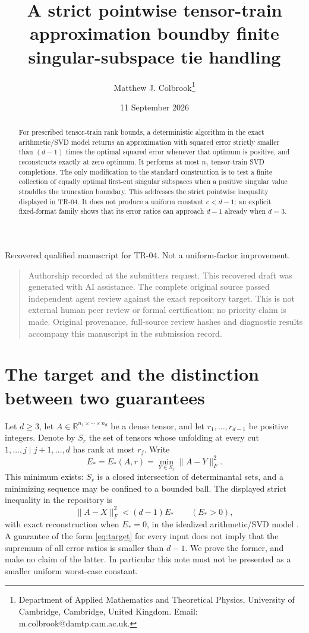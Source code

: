 \documentclass[11pt]{article}
\title{A strict pointwise tensor-train approximation bound\newline by finite singular-subspace tie handling}
\author{Matthew J. Colbrook\thanks{Department of Applied Mathematics and Theoretical Physics, University of Cambridge, Cambridge, United Kingdom. Email: m.colbrook@damtp.cam.ac.uk.}}
\date{11 September 2026}
\newcommand{\R}{\mathbb R}
\begin{document}
\maketitle
\begin{center}\small Recovered qualified manuscript for TR-04. Not a uniform-factor improvement.\end{center}
\begin{quote}\small Authorship recorded at the submitter\textquotesingle s request. This recovered draft was generated with AI assistance. The complete original source passed independent agent review against the exact repository target. This is not external human peer review or formal certification; no priority claim is made. Original provenance, full-source review hashes and diagnostic results accompany this manuscript in the submission record.\end{quote}
\begin{abstract}
For prescribed tensor-train rank bounds, a deterministic algorithm in
the exact arithmetic/SVD model returns an approximation with squared
error strictly smaller than $(d-1)$ times the optimal squared error
whenever that optimum is positive, and reconstructs exactly at zero
optimum. It performs at most $n_1$ tensor-train SVD completions. The only
modification to the standard construction is to test a finite collection
of equally optimal first-cut singular subspaces when a positive singular
value straddles the truncation boundary. This addresses the strict
pointwise inequality displayed in TR-04. It does not produce a uniform
constant $c<d-1$: an explicit fixed-format family shows that its error
ratios can approach $d-1$ already when $d=3$.
\end{abstract}

\section{The target and the distinction between two guarantees}
Let $d\ge3$, let $A\in\R^{n_1\times\cdots\times n_d}$ be a dense tensor,
and let $r_1,\ldots,r_{d-1}$ be positive integers. Denote by $S_r$ the
set of tensors whose unfolding at every cut $1,\ldots,j\mid j+1,\ldots,d$
has rank at most $r_j$. Write
\[
 E_* = E_*(A,r)=\min_{Y\in S_r}\|A-Y\|_F^2.
\]
This minimum exists: $S_r$ is a closed intersection of determinantal
sets, and a minimizing sequence may be confined to a bounded ball.
The displayed strict inequality in the repository is
\begin{equation}\label{eq:target}
 \|A-X\|_F^2<(d-1)E_*\qquad(E_*>0),
\end{equation}
with exact reconstruction when $E_*=0$, in the idealized arithmetic/SVD
model \cite{repo,workshop}.
A guarantee of the form \eqref{eq:target} for every input does not imply
that the supremum of all error ratios is smaller than $d-1$. We prove
the former, and make no claim of the latter. In particular this note
must not be presented as a smaller uniform worst-case constant.
\end{document}
